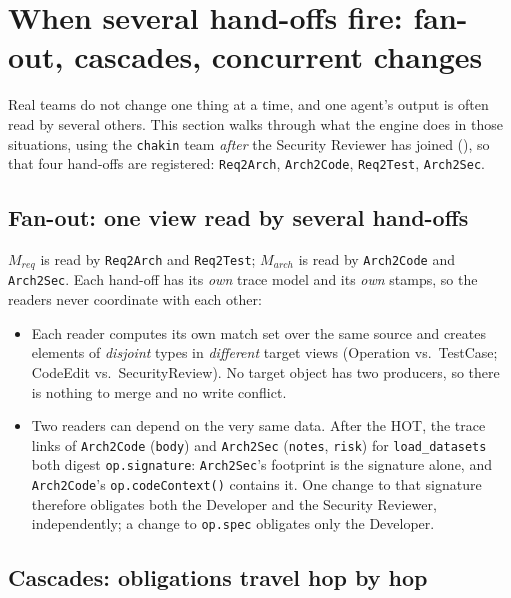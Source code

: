 \documentclass[10pt,a4paper]{article}
\newcommand{\cls}[1]{\textsf{#1}}
\newcommand{\code}[1]{\texttt{#1}}
\theoremstyle{definition}
\begin{document}
\section{When several hand-offs fire: fan-out, cascades, concurrent changes}\label{sec:multi}

Real teams do not change one thing at a time, and one agent's output is often
read by several others. This section walks through what the engine does in
those situations, using the \texttt{chakin} team \emph{after} the Security
Reviewer has joined (), so that four hand-offs are registered:
\code{Req2Arch}, \code{Arch2Code}, \code{Req2Test}, \code{Arch2Sec}.

\subsection{Fan-out: one view read by several hand-offs}

$M_{\mathit{req}}$ is read by \code{Req2Arch} and \code{Req2Test};
$M_{\mathit{arch}}$ is read by \code{Arch2Code} and \code{Arch2Sec}. Each
hand-off has its \emph{own} trace model and its \emph{own} stamps, so the
readers never coordinate with each other:

\begin{itemize}[nosep]
\item Each reader computes its own match set over the same source and creates
elements of \emph{disjoint} types in \emph{different} target views
(\cls{Operation} vs.\ \cls{TestCase}; \cls{CodeEdit} vs.\
\cls{SecurityReview}). No target object has two producers, so there is
nothing to merge and no write conflict.
\item Two readers can depend on the very same data. After the HOT, the trace
links of \code{Arch2Code} (\code{body}) and \code{Arch2Sec} (\code{notes},
\code{risk}) for \code{load_datasets} both digest \code{op.signature}:
\code{Arch2Sec}'s footprint is the signature alone, and \code{Arch2Code}'s
\code{op.codeContext()} contains it. One change to that signature therefore
obligates both the Developer and the Security Reviewer, independently; a
change to \code{op.spec} obligates only the Developer.
\end{itemize}

\subsection{Cascades: obligations travel hop by hop}
\end{document}
